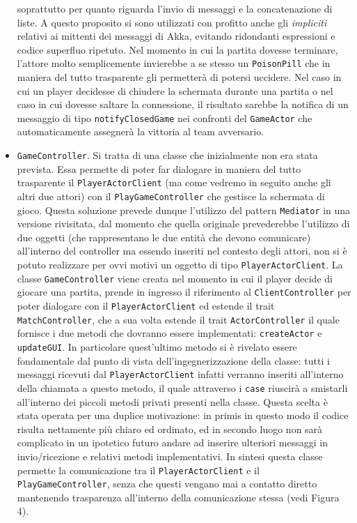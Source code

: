 \begin{itemize}
soprattutto per quanto riguarda l'invio di messaggi e la concatenazione di liste. A questo proposito si sono utilizzati con profitto anche gli \textit{impliciti} relativi ai mittenti dei messaggi di Akka, evitando ridondanti espressioni e codice superfluo ripetuto. Nel momento in cui la partita dovesse terminare, l'attore molto semplicemente invierebbe a se stesso un \texttt{PoisonPill} che in maniera del tutto trasparente gli permetterà di potersi uccidere. Nel caso in cui un player decidesse di chiudere la schermata durante una partita o nel caso in cui dovesse saltare la connessione, il risultato sarebbe la notifica di un messaggio di tipo \texttt{notifyClosedGame} nei confronti del \texttt{GameActor} che automaticamente assegnerà la vittoria al team avversario.
     
     \item \texttt{GameController}.
    Si tratta di una classe che inizialmente non era stata prevista. Essa permette di poter far dialogare in maniera del tutto trasparente il \texttt{PlayerActorClient} (ma come vedremo in seguito anche gli altri due attori) con il \texttt{PlayGameController} che gestisce la schermata di gioco. Questa soluzione prevede dunque l'utilizzo del pattern \texttt{Mediator} in una versione rivisitata, dal momento che quella originale prevederebbe l'utilizzo di due oggetti (che rappresentano le due entità che devono comunicare) all'interno del controller ma essendo inseriti nel contesto degli attori, non si è potuto realizzare per ovvi motivi un oggetto di tipo \texttt{PlayerActorClient}. La classe \texttt{GameController} viene creata nel momento in cui il player decide di giocare una partita, prende in ingresso il riferimento al \texttt{ClientController} per poter dialogare con il \texttt{PlayerActorClient} ed estende il trait \texttt{MatchController}, che a sua volta estende il trait \texttt{ActorController} il quale fornisce i due metodi che dovranno essere implementati: \texttt{createActor} e \texttt{updateGUI}. In particolare quest'ultimo metodo si è rivelato essere fondamentale dal punto di vista dell'ingegnerizzazione della classe: tutti i messaggi ricevuti dal \texttt{PlayerActorClient} infatti verranno inseriti all'interno della chiamata a questo metodo, il quale attraverso i \texttt{case} riuscirà a smistarli all'interno dei piccoli metodi privati presenti nella classe. Questa scelta è stata operata per una duplice motivazione: in primis in questo modo il codice risulta nettamente più chiaro ed ordinato, ed in secondo luogo non sarà complicato in un ipotetico futuro andare ad inserire ulteriori messaggi in invio/ricezione e relativi metodi implementativi. In sintesi questa classe permette la comunicazione tra il \texttt{PlayerActorClient} e il \texttt{PlayGameController}, senza che questi vengano mai a contatto diretto mantenendo trasparenza all'interno della comunicazione stessa (vedi Figura 4).
    

\end{itemize}
